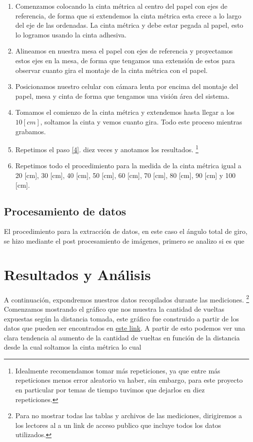\documentclass{article}
\begin{document}
\begin{enumerate}
    \item Comenzamos colocando la cinta métrica al centro del papel con ejes de referencia, de forma que si extendemos la cinta métrica esta crece a lo largo del eje de las ordenadas. La cinta métrica y debe estar pegada al papel, esto lo logramos usando la cinta adhesiva.
    \item Alineamos en nuestra mesa el papel con ejes de referencia y proyectamos estos ejes en la mesa, de forma que tengamos una extensión de estos para observar cuanto gira el montaje de la cinta métrica con el papel. 
    \item Posicionamos nuestro celular con cámara lenta por encima del montaje del papel, mesa y cinta de forma que tengamos una visión área del sistema.
    \item Tomamos el comienzo de la cinta métrica y extendemos hasta llegar a los $10 [cm]$, soltamos la cinta y vemos cuanto gira. Todo este proceso mientras grabamos. \label{4} 
    \item Repetimos el paso \ref{4}. diez veces y anotamos los resultados. \footnote{Idealmente recomendamos tomar más repeticiones, ya que entre más repeticiones menos error aleatorio va haber, sin embargo, para este proyecto en particular por temas de tiempo tuvimos que dejarlos en diez repeticiones.}
    \item Repetimos todo el procedimiento para la medida de la cinta métrica igual a 20 [cm], 30 [cm], 40 [cm], 50 [cm], 60 [cm], 70 [cm], 80 [cm], 90 [cm] y 100 [cm].
\end{enumerate}

\subsection{Procesamiento de datos}
El procedimiento para la extracción de datos, en este caso el ángulo total de giro, se hizo mediante el post procesamiento de imágenes, primero se analizo si es que   
    


\section{Resultados y Análisis}
A continuación, expondremos nuestros datos recopilados durante las mediciones. \footnote{Para no mostrar todas las tablas y archivos de las mediciones, dirigiremos a los lectores al a un link de acceso publico que incluye todos los datos utilizados.} Comenzamos mostrando el gráfico que nos muestra la cantidad de vueltas expuestas según la distancia tomada, este gráfico fue construido a partir de los datos que pueden ser encontrados en \href{https://github.com/ayalin7/El-proyectito/blob/main/graficos/datos/giro.txt}{este link}. A partir de esto podemos ver una clara tendencia al aumento de la cantidad de vueltas en función de la distancia desde la cual soltamos la cinta métrica lo cual  
\end{document}
